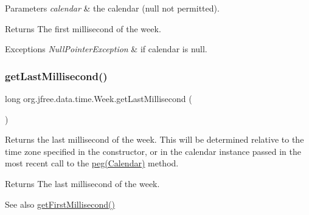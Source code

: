 \begin{DoxyParams}{Parameters}
{\em calendar} & the calendar ({\ttfamily null} not permitted).\\
\hline
\end{DoxyParams}
\begin{DoxyReturn}{Returns}
The first millisecond of the week.
\end{DoxyReturn}

\begin{DoxyExceptions}{Exceptions}
{\em Null\+Pointer\+Exception} & if {\ttfamily calendar} is {\ttfamily null}. \\
\hline
\end{DoxyExceptions}
\mbox{\label{classorg_1_1jfree_1_1data_1_1time_1_1_week_ad26539f6b31019dcb21ec373ff07ed0e}} 
\subsubsection{\texorpdfstring{get\+Last\+Millisecond()}{getLastMillisecond()}\hspace{0.1cm}{\footnotesize\ttfamily [1/2]}}
{\footnotesize\ttfamily long org.\+jfree.\+data.\+time.\+Week.\+get\+Last\+Millisecond (\begin{DoxyParamCaption}{ }\end{DoxyParamCaption})}

Returns the last millisecond of the week. This will be determined relative to the time zone specified in the constructor, or in the calendar instance passed in the most recent call to the \mbox{\hyperlink{classorg_1_1jfree_1_1data_1_1time_1_1_week_ab58b703a2f1d37a0daffef7f6d509122}{peg(\+Calendar)}} method.

\begin{DoxyReturn}{Returns}
The last millisecond of the week.
\end{DoxyReturn}
\begin{DoxySeeAlso}{See also}
\mbox{\hyperlink{classorg_1_1jfree_1_1data_1_1time_1_1_week_a75fe3256e304fb99a5dc9c75c673b318}{get\+First\+Millisecond()}} 
\end{DoxySeeAlso}
\mbox{\label{classorg_1_1jfree_1_1data_1_1time_1_1_week_ac4aafbde4298deacd05e26f795af5f41}} 
